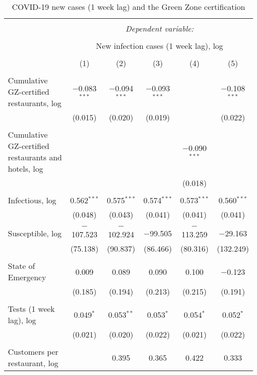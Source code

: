 
\begin{table}[H] \centering 
  \caption{COVID-19 new cases (1 week lag) and the Green Zone certification} 
  \label{} 
\scriptsize 
\begin{tabular}{@{\extracolsep{1pt}}lccccc} 
\\[-1.8ex]\hline 
\hline \\[-1.8ex] 
 & \multicolumn{5}{c}{\textit{Dependent variable:}} \\ 
\cline{2-6} 
\\[-1.8ex] & \multicolumn{5}{c}{New infection cases (1 week lag), log} \\ 
\\[-1.8ex] & (1) & (2) & (3) & (4) & (5)\\ 
\hline \\[-1.8ex] 
 Cumulative GZ-certified restaurants, log & $-$0.083$^{***}$ & $-$0.094$^{***}$ & $-$0.093$^{***}$ &  & $-$0.108$^{***}$ \\ 
  & (0.015) & (0.020) & (0.019) &  & (0.022) \\ 
  & & & & & \\ 
 Cumulative GZ-certified restaurants and hotels, log &  &  &  & $-$0.090$^{***}$ &  \\ 
  &  &  &  & (0.018) &  \\ 
  & & & & & \\ 
 Infectious, log & 0.562$^{***}$ & 0.575$^{***}$ & 0.574$^{***}$ & 0.573$^{***}$ & 0.560$^{***}$ \\ 
  & (0.048) & (0.043) & (0.041) & (0.041) & (0.041) \\ 
  & & & & & \\ 
 Susceptible, log & $-$107.523 & $-$102.924 & $-$99.505 & $-$113.259 & $-$29.163 \\ 
  & (75.138) & (90.837) & (86.466) & (80.316) & (132.249) \\ 
  & & & & & \\ 
 State of Emergency & 0.009 & 0.089 & 0.090 & 0.100 & $-$0.123 \\ 
  & (0.185) & (0.194) & (0.213) & (0.215) & (0.191) \\ 
  & & & & & \\ 
 Tests (1 week lag), log & 0.049$^{*}$ & 0.053$^{**}$ & 0.053$^{*}$ & 0.054$^{*}$ & 0.052$^{*}$ \\ 
  & (0.021) & (0.020) & (0.022) & (0.021) & (0.022) \\ 
  & & & & & \\ 
 Customers per restaurant, log &  & 0.395 & 0.365 & 0.422 & 0.333 \\ 

\end{tabular}
\end{table}

